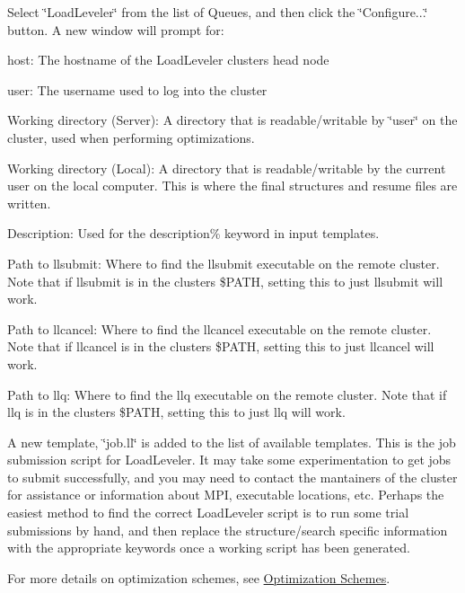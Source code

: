 Select \char`\"{}\+Load\+Leveler\char`\"{} from the list of Queues, and then click the \char`\"{}\+Configure...\char`\"{} button. A new window will prompt for\+:
\begin{DoxyItemize}
\item host\+: The hostname of the Load\+Leveler cluster\textquotesingle{}s head node
\item user\+: The username used to log into the cluster
\item Working directory (Server)\+: A directory that is readable/writable by \char`\"{}user\char`\"{} on the cluster, used when performing optimizations.
\item Working directory (Local)\+: A directory that is readable/writable by the current user on the local computer. This is where the final structures and resume files are written.
\item Description\+: Used for the description\% keyword in input templates.
\item Path to llsubmit\+: Where to find the llsubmit executable on the remote cluster. Note that if llsubmit is in the cluster\textquotesingle{}s \$\+P\+A\+T\+H, setting this to just \textquotesingle{}llsubmit\textquotesingle{} will work.
\item Path to llcancel\+: Where to find the llcancel executable on the remote cluster. Note that if llcancel is in the cluster\textquotesingle{}s \$\+P\+A\+T\+H, setting this to just \textquotesingle{}llcancel\textquotesingle{} will work.
\item Path to llq\+: Where to find the llq executable on the remote cluster. Note that if llq is in the cluster\textquotesingle{}s \$\+P\+A\+T\+H, setting this to just \textquotesingle{}llq\textquotesingle{} will work.
\end{DoxyItemize}

A new template, \char`\"{}job.\+ll\char`\"{} is added to the list of available templates. This is the job submission script for Load\+Leveler. It may take some experimentation to get jobs to submit successfully, and you may need to contact the mantainers of the cluster for assistance or information about M\+P\+I, executable locations, etc. Perhaps the easiest method to find the correct Load\+Leveler script is to run some trial submissions by hand, and then replace the structure/search specific information with the appropriate keywords once a working script has been generated.

For more details on optimization schemes, see \hyperlink{optschemes}{Optimization Schemes}.

